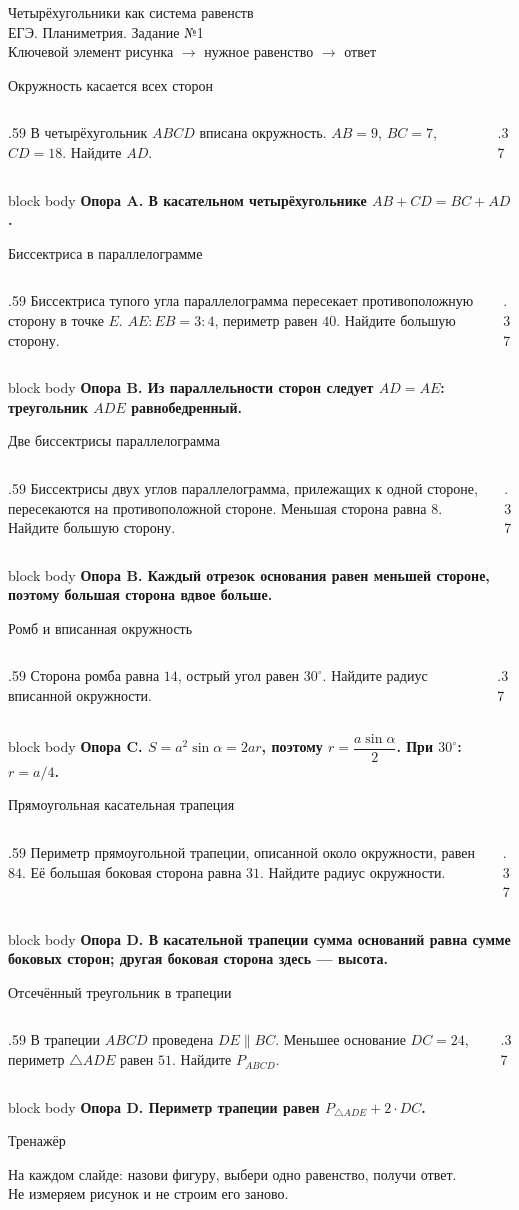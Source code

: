 \documentclass[aspectratio=169,12pt]{beamer}
\newcommand{\support}[2]{%
\vfill
\begin{beamercolorbox}[wd=\linewidth,sep=1.1ex,rounded=true,shadow=false]{block body}
\textbf{#1}\quad #2
\end{beamercolorbox}}
\newcommand{\taskframe}[4]{%
\begin{frame}{#1}
\begin{columns}[T,onlytextwidth]
\begin{column}{.59\textwidth}
\vspace{3mm}\Large #2
\end{column}
\begin{column}{.37\textwidth}
\centering\resizebox{\linewidth}{!}{#3}
\end{column}
\end{columns}
\support{#4}{}
\end{frame}}
\begin{document}
\begin{frame}
\vfill
\begin{center}
{\color{lessonblue} Четырёхугольники как система равенств}\\[8mm]
{\Large ЕГЭ. Планиметрия. Задание №1}\\[15mm]
{\large Ключевой элемент рисунка \(\rightarrow\) нужное равенство \(\rightarrow\) ответ}
\end{center}
\vfill
\end{frame}

\taskframe{Окружность касается всех сторон}{
В четырёхугольник \(ABCD\) вписана окружность. \(AB=9\), \(BC=7\),
\(CD=18\). Найдите \(AD\).
}{\figTangentialQuad{9}{7}{18}}{Опора A. В касательном четырёхугольнике \(AB+CD=BC+AD\).}

\taskframe{Биссектриса в параллелограмме}{
Биссектриса тупого угла параллелограмма пересекает противоположную сторону
в точке \(E\). \(AE:EB=3:4\), периметр равен \(40\). Найдите большую сторону.
}{\figParallelogramBisector}{Опора B. Из параллельности сторон следует \(AD=AE\): треугольник \(ADE\) равнобедренный.}

\taskframe{Две биссектрисы параллелограмма}{
Биссектрисы двух углов параллелограмма, прилежащих к одной стороне,
пересекаются на противоположной стороне. Меньшая сторона равна \(8\).
Найдите большую сторону.
}{\figParallelogramTwoBisectors}{Опора B. Каждый отрезок основания равен меньшей стороне, поэтому большая сторона вдвое больше.}

\taskframe{Ромб и вписанная окружность}{
Сторона ромба равна \(14\), острый угол равен \(30^\circ\). Найдите
радиус вписанной окружности.
}{\figRhombusCircle{14}}{Опора C. \(S=a^2\sin\alpha=2ar\), поэтому \(r=\dfrac{a\sin\alpha}{2}\). При \(30^\circ\): \(r=a/4\).}

\taskframe{Прямоугольная касательная трапеция}{
Периметр прямоугольной трапеции, описанной около окружности, равен \(84\).
Её большая боковая сторона равна \(31\). Найдите радиус окружности.
}{\figRightTangentialTrapezoid{31}}{Опора D. В касательной трапеции сумма оснований равна сумме боковых сторон; другая боковая сторона здесь --- высота.}

\taskframe{Отсечённый треугольник в трапеции}{
В трапеции \(ABCD\) проведена \(DE\parallel BC\). Меньшее основание
\(DC=24\), периметр \(\triangle ADE\) равен \(51\). Найдите \(P_{ABCD}\).
}{\figTrapezoidParallel{24}{51}}{Опора D. Периметр трапеции равен \(P_{\triangle ADE}+2\cdot DC\).}

\begin{frame}{Тренажёр}
\begin{center}
\Large На каждом слайде: назови фигуру, выбери одно равенство, получи ответ.\\[8mm]
\large Не измеряем рисунок и не строим его заново.
\end{center}
\end{frame}
\end{document}

